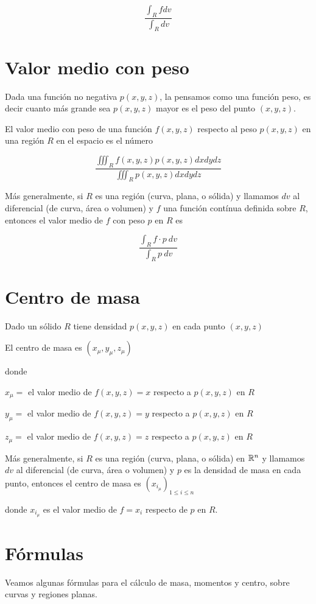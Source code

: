 $$ \frac{ \int_R f dv }{ \int_R dv }  $$

\section{Valor medio con peso}

Dada una función no negativa $p(x,y,z)$, la pensamos como una función peso, es decir cuanto más grande sea $p(x,y,z)$ mayor es el peso del punto $(x,y,z)$.

El valor medio con peso de una función $f(x,y,z)$ respecto al peso $p(x,y,z)$ en una región $R$ en el espacio es el número

$$\frac{ \iiint_R f(x,y,z) p(x,y,z) dxdydz}{ \iiint_R p(x,y,z) dxdydz} $$

Más generalmente, si $R$ es una región (curva, plana, o sólida) y llamamos $dv$ al diferencial (de curva, área o volumen) y $f$ una función contínua definida sobre $R$, entonces el valor medio de $f$ con peso $p$ en $R$ es

$$\frac{ \int_R f \cdot p \ dv}{ \int_R p \ dv} $$

\section{Centro de masa}

Dado un sólido $R$ tiene densidad $p(x,y,z)$ en cada punto $(x,y,z)$

El centro de masa es $(x_\mu, y_\mu, z_\mu)$

donde

$x_\mu =$ el valor medio de $f(x,y,z) = x$ respecto a $p(x,y,z)$ en $R$

$y_\mu =$ el valor medio de $f(x,y,z) = y$ respecto a $p(x,y,z)$ en $R$

$z_\mu =$ el valor medio de $f(x,y,z) = z$ respecto a $p(x,y,z)$ en $R$

Más generalmente, si $R$ es una región (curva, plana, o sólida) en $\mathbb{R}^n$ y llamamos $dv$ al diferencial (de curva, área o volumen) y $p$ es la densidad de masa en cada punto, entonces el centro de masa es $(x_{i_\mu})_{1 \leq i \leq n} $

donde $x_{i_\mu}$ es el valor medio de $f=x_i$ respecto de $p$ en $R$.

\section{Fórmulas}

Veamos algunas fórmulas para el cálculo de masa, momentos y centro, sobre curvas y regiones planas.

